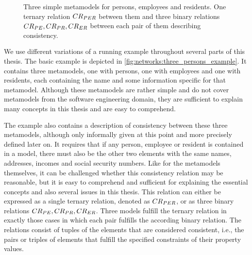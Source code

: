 
\begin{figure}
    \centering
    
    \caption[Three metamodels with exemplary consistency relations]{Three simple metamodels for persons, employees and residents. One ternary relation $\consistencyrelation{CR}{PER}$ between them and three binary relations $\consistencyrelation{CR}{PE}, \consistencyrelation{CR}{PR}, \consistencyrelation{CR}{ER}$ between each pair of them describing consistency.}
    \label{fig:networks:three_persons_example}
\end{figure}

We use different variations of a running example throughout several parts of this thesis.
The basic example is depicted in \autoref{fig:networks:three_persons_example}.
It contains three metamodels, one with persons, one with employees and one with residents, each containing the name and some information specific for that metamodel.
Although these metamodels are rather simple and do not cover metamodels from the software engineering domain, they are sufficient to explain many concepts in this thesis and are easy to comprehend.

The example also contains a description of consistency between these three metamodels, although only informally given at this point and more precisely defined later on.
It requires that if any person, employee or resident is contained in a model, there must also be the other two elements with the same names, addresses, incomes and social security numbers.
Like for the metamodels themselves, it can be challenged whether this consistency relation may be reasonable, but it is easy to comprehend and sufficient for explaining the essential concepts and also several issues in this thesis.
This relation can either be expressed as a single ternary relation, denoted as $\consistencyrelation{CR}{PER}$, or as three binary relations $\consistencyrelation{CR}{PE}, \consistencyrelation{CR}{PR}, \consistencyrelation{CR}{ER}$.
Three models fulfill the ternary relation in exactly those cases in which each pair fulfills the according binary relation.
The relations consist of tuples of the elements that are considered consistent, i.e., the pairs or triples of elements that fulfill the specified constraints of their property values.

